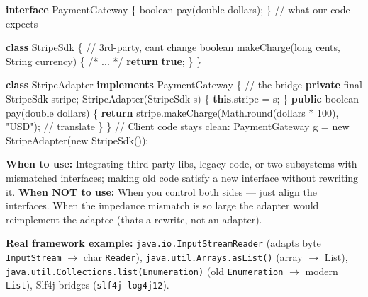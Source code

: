 \documentclass[11pt]{article}
\newenvironment{Shaded}{\begin{snugshade}}{\end{snugshade}}
\newcommand{\BuiltInTok}[1]{\textcolor[rgb]{0.50,0.55,0.55}{#1}}
\newcommand{\CommentTok}[1]{\textcolor[rgb]{0.48,0.49,0.49}{#1}}
\newcommand{\ControlFlowTok}[1]{\textcolor[rgb]{0.99,0.74,0.29}{\textbf{#1}}}
\newcommand{\DataTypeTok}[1]{\textcolor[rgb]{0.16,0.50,0.73}{#1}}
\newcommand{\DecValTok}[1]{\textcolor[rgb]{0.96,0.45,0.00}{#1}}
\newcommand{\FunctionTok}[1]{\textcolor[rgb]{0.56,0.27,0.68}{#1}}
\newcommand{\KeywordTok}[1]{\textcolor[rgb]{0.81,0.81,0.76}{\textbf{#1}}}
\newcommand{\NormalTok}[1]{\textcolor[rgb]{0.81,0.81,0.76}{#1}}
\newcommand{\OperatorTok}[1]{\textcolor[rgb]{0.81,0.81,0.76}{#1}}
\newcommand{\StringTok}[1]{\textcolor[rgb]{0.96,0.31,0.31}{#1}}
\begin{document}
\begin{Shaded}
\begin{Highlighting}[]
\KeywordTok{interface}\NormalTok{ PaymentGateway }\OperatorTok{\{} \DataTypeTok{boolean} \FunctionTok{pay}\OperatorTok{(}\DataTypeTok{double}\NormalTok{ dollars}\OperatorTok{);} \OperatorTok{\}}   \CommentTok{// what our code expects}

\KeywordTok{class}\NormalTok{ StripeSdk }\OperatorTok{\{}                                           \CommentTok{// 3rd{-}party, can\textquotesingle{}t change}
    \DataTypeTok{boolean} \FunctionTok{makeCharge}\OperatorTok{(}\DataTypeTok{long}\NormalTok{ cents}\OperatorTok{,} \BuiltInTok{String}\NormalTok{ currency}\OperatorTok{)} \OperatorTok{\{} \CommentTok{/* ... */} \ControlFlowTok{return} \KeywordTok{true}\OperatorTok{;} \OperatorTok{\}}
\OperatorTok{\}}

\KeywordTok{class}\NormalTok{ StripeAdapter }\KeywordTok{implements}\NormalTok{ PaymentGateway }\OperatorTok{\{}            \CommentTok{// the bridge}
    \KeywordTok{private} \DataTypeTok{final}\NormalTok{ StripeSdk stripe}\OperatorTok{;}
    \FunctionTok{StripeAdapter}\OperatorTok{(}\NormalTok{StripeSdk s}\OperatorTok{)} \OperatorTok{\{} \KeywordTok{this}\OperatorTok{.}\FunctionTok{stripe} \OperatorTok{=}\NormalTok{ s}\OperatorTok{;} \OperatorTok{\}}
    \KeywordTok{public} \DataTypeTok{boolean} \FunctionTok{pay}\OperatorTok{(}\DataTypeTok{double}\NormalTok{ dollars}\OperatorTok{)} \OperatorTok{\{}
        \ControlFlowTok{return}\NormalTok{ stripe}\OperatorTok{.}\FunctionTok{makeCharge}\OperatorTok{(}\BuiltInTok{Math}\OperatorTok{.}\FunctionTok{round}\OperatorTok{(}\NormalTok{dollars }\OperatorTok{*} \DecValTok{100}\OperatorTok{),} \StringTok{"USD"}\OperatorTok{);}  \CommentTok{// translate}
    \OperatorTok{\}}
\OperatorTok{\}}
\CommentTok{// Client code stays clean: PaymentGateway g = new StripeAdapter(new StripeSdk());}
\end{Highlighting}
\end{Shaded}

\textbf{When to use:} Integrating third-party libs, legacy code, or two subsystems with mismatched interfaces; making old code satisfy a new interface without rewriting it. \textbf{When NOT to use:} When you control both sides --- just align the interfaces. When the impedance mismatch is so large the adapter would reimplement the adaptee (that\textquotesingle s a rewrite, not an adapter).

\textbf{Real framework example:} \texttt{java.io.InputStreamReader} (adapts byte \texttt{InputStream} \(\rightarrow\) char \texttt{Reader}), \texttt{java.util.Arrays.asList()} (array \(\rightarrow\) List), \texttt{java.util.Collections.list(Enumeration)} (old \texttt{Enumeration} \(\rightarrow\) modern \texttt{List}), Slf4j bridges (\texttt{slf4j-log4j12}).
\end{document}
